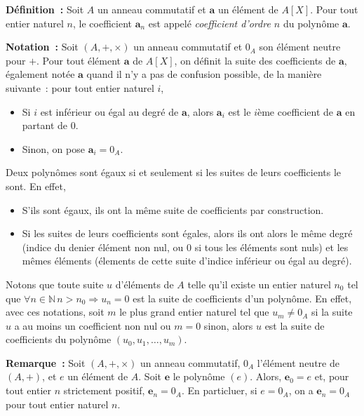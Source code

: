 \medskip

\noindent\textbf{Définition :} Soit $A$ un anneau commutatif et $\mathbf{a}$ un élément de $A[X]$.
    Pour tout entier naturel $n$, le coefficient $\mathbf{a}_n$ est appelé \emph{coefficient d'ordre $n$} du polynôme $\mathbf{a}$.

\medskip

\noindent\textbf{Notation :} 
    Soit $(A, +, \times)$ un anneau commutatif et $0_A$ son élément neutre pour $+$.
    Pour tout élément $\mathbf{a}$ de $A[X]$, on définit la suite des coefficients de $\mathbf{a}$, également notée $\mathbf{a}$ quand il n'y a pas de confusion possible, de la manière suivante : pour tout entier naturel $i$, 
\begin{itemize}[nosep]
    \item Si $i$ est inférieur ou égal au degré de $\mathbf{a}$, alors $\mathbf{a}_i$ est le $i$ème coefficient de $\mathbf{a}$ en partant de $0$.
    \item Sinon, on pose $\mathbf{a}_i = 0_A$.
\end{itemize}
Deux polynômes sont égaux si et seulement si les suites de leurs coefficients le sont.
En effet, 
\begin{itemize}[nosep]
    \item S'ils sont égaux, ils ont la même suite de coefficients par construction.
    \item Si les suites de leurs coefficients sont égales, alors ils ont alors le même degré (indice du denier élément non nul, ou $0$ si tous les éléments sont nuls) et les mêmes éléments (élements de cette suite d'indice inférieur ou égal au degré).
\end{itemize}
Notons que toute suite $u$ d'éléments de $A$ telle qu'il existe un entier naturel $n_0$ tel que $\forall n \in \mathbb{N} \, n > n_0 \Rightarrow u_n = 0$ est la suite de coefficients d'un polynôme. 
En effet, avec ces notations, soit $m$ le plus grand entier naturel tel que $u_m \neq 0_A$ si la suite $u$ a au moins un coefficient non nul ou $m = 0$ sinon, alors $u$ est la suite de coefficients du polynôme $(u_0, u_1, \dots, u_m)$.

\medskip

\noindent\textbf{Remarque :} 
    Soit $(A, +, \times)$ un anneau commutatif, $0_A$ l'élément neutre de $(A, +)$, et $e$ un élément de $A$.
    Soit $\mathbf{e}$ le polynôme $(e)$.
    Alors, $\mathbf{e}_0 = e$ et, pour tout entier $n$ strictement positif, $\mathbf{e}_n = 0_A$.
    En particluer, si $e = 0_A$, on a $\mathbf{e}_n = 0_A$ pour tout entier naturel $n$.

